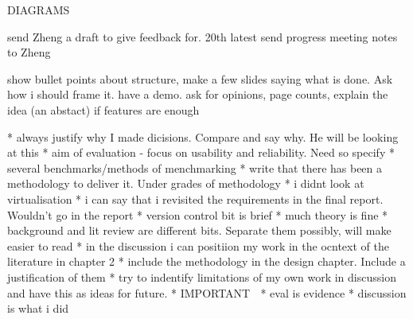 \documentclass[a4paper]{report}
\begin{document}
     DIAGRAMS

     send Zheng a draft to give feedback for. 20th latest
     send progress meeting notes to Zheng

     show bullet points about structure, make a few slides saying what is
     done. Ask how i should frame it. have a demo. ask for opinions, page
     counts, explain the idea (an abstact) if features are enough


    * always justify why I made dicisions. Compare and say why. He will be looking at this
    * aim of evaluation - focus on usability and reliability. Need so specify
    * several benchmarks/methods of menchmarking
    * write that there has been a methodology to deliver it. Under grades of methodology
    * i didnt look at virtualisation
    * i can say that i revisited the requirements in the final report. Wouldn't go in the report
    * version control bit is brief
    * much theory is fine
    * background and lit review are different bits. Separate them possibly, will make easier to read
    * in the discussion i can positiion my work in the ocntext of the literature in chapter 2
    * include the methodology in the design chapter. Include a justification of them
    * try to indentify limitations of my own work in discussion and have this as ideas for future.
    * IMPORTANT ^^^
    * eval is evidence
    * discussion is what i did
\end{document}
